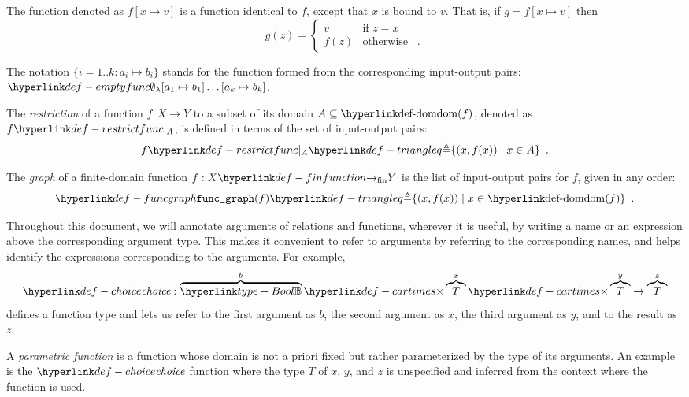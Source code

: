\begin{definition}
  The function denoted as $f[x \mapsto v]$ is a function identical to $f$, except that $x$ is bound
  to $v$. That is, if  $g = f[x \mapsto v]$ then
  \[
    g(z) =
  \begin{cases}
    v     & \text{if } z = x\\
    f(z)  & \text{otherwise } \enspace.
  \end{cases}
  \]

  The notation $\{i=1..k: a_i\mapsto b_i\}$ stands for the function formed from the corresponding input-output pairs:
  $\emptyfunc[a_1\mapsto b_1]\ldots[a_k\mapsto b_k]$.
\end{definition}

\begin{definition}
\hypertarget{def-restrictfunc}{}
The \emph{restriction} of a function $f : X \rightarrow Y$ to a subset of its domain
$A \subseteq \dom(f)$, denoted as $\restrictfunc{f}{A}$, is defined
in terms of the set of input-output pairs:
\[
  \restrictfunc{f}{A} \triangleq \{ (x, f(x)) \;|\; x \in A \} \enspace.
\]
\end{definition}

\begin{definition}
\hypertarget{def-funcgraph}{}
The \emph{graph} of a finite-domain function $f : X \rightarrowfin Y$
is the list of input-output pairs for $f$, given in any order:
\[
\funcgraph(f) \triangleq \{ (x, f(x)) \;|\; x \in \dom(f) \} \enspace.
\]
\end{definition}

Throughout this document, we will annotate arguments of relations and functions, wherever it is useful,
by writing a name or an expression above the corresponding argument type.
This makes it convenient to refer to arguments by referring to the corresponding names, and helps identify
the expressions corresponding to the arguments.
For example,
\[
    \choicename : \overname{\Bool}{b} \cartimes \overname{T}{x} \cartimes \overname{T}{y} \rightarrow \overname{T}{z}
\]
defines a function type and lets us refer to the first argument as $b$, the second argument as $x$,
the third argument as $y$, and to the result as $z$.

A \emph{parametric function} is a function whose domain is not a priori fixed but rather
parameterized by the type of its arguments. An example is the $\choicename$ function where the type $T$ of
$x$, $y$, and $z$ is unspecified and inferred from the context where the function is used.

